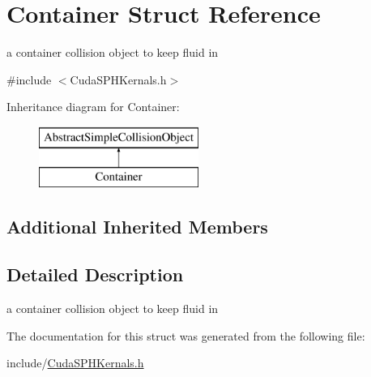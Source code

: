 \hypertarget{struct_container}{\section{Container Struct Reference}
\label{struct_container}
}


a container collision object to keep fluid in  




{\ttfamily \#include $<$Cuda\-S\-P\-H\-Kernals.\-h$>$}

Inheritance diagram for Container\-:\begin{figure}[H]
\begin{center}
\leavevmode
\includegraphics[height=2.000000cm]{struct_container}
\end{center}
\end{figure}
\subsection*{Additional Inherited Members}


\subsection{Detailed Description}
a container collision object to keep fluid in 

The documentation for this struct was generated from the following file\-:\begin{DoxyCompactItemize}
\item 
include/\hyperlink{_cuda_s_p_h_kernals_8h}{Cuda\-S\-P\-H\-Kernals.\-h}\end{DoxyCompactItemize}
